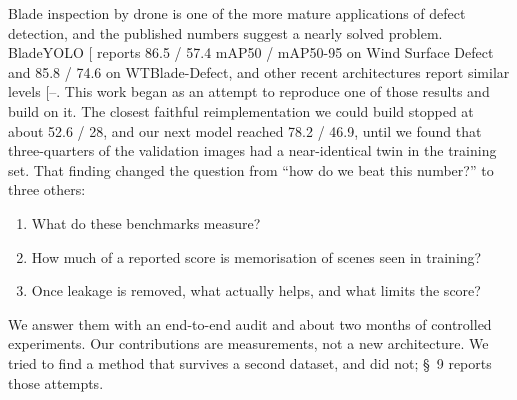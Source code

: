 \documentclass[
  10pt,
]{article}
\providecommand{\tightlist}{%
  \setlength{\itemsep}{0pt}\setlength{\parskip}{0pt}}
\begin{document}
Blade inspection by drone is one of the more mature applications of
defect detection, and the published numbers suggest a nearly solved
problem. BladeYOLO {[}\citeproc{ref-bladeyolo}{1}{]} reports 86.5 / 57.4
mAP50 / mAP50-95 on Wind Surface Defect and 85.8 / 74.6 on
WTBlade-Defect, and other recent architectures report similar levels
{[}--\citeproc{ref-kgpyolo}{4}{]}. This work
began as an attempt to reproduce one of those results and build on it.
The closest faithful reimplementation we could build stopped at about
52.6 / 28, and our next model reached 78.2 / 46.9, until we found that
three-quarters of the validation images had a near-identical twin in the
training set. That finding changed the question from ``how do we beat
this number?'' to three others:

\begin{enumerate}
\def\labelenumi{\arabic{enumi}.}
\tightlist
\item
  What do these benchmarks measure?
\item
  How much of a reported score is memorisation of scenes seen in
  training?
\item
  Once leakage is removed, what actually helps, and what limits the
  score?
\end{enumerate}

We answer them with an end-to-end audit and about two months of
controlled experiments. Our contributions are measurements, not a new
architecture. We tried to find a method that survives a second dataset,
and did not; §~9 reports those attempts.
\end{document}
